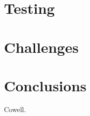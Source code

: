 \documentclass[a4paper]{article}
\begin{document}
\section{Testing}

\section{Challenges}


\section{Conclusions}

\begin{thebibliography}{99}
 Cowell.
\end{thebibliography}
\end{document}
